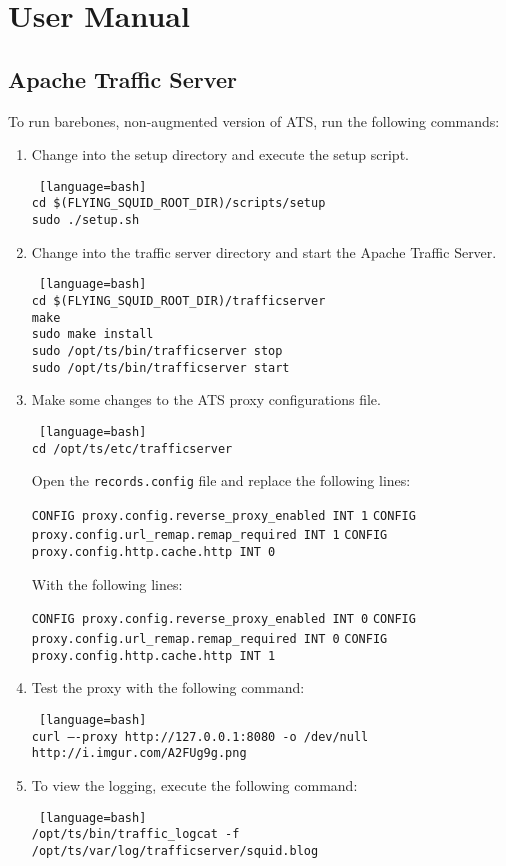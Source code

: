 \section{User Manual}

\subsection{Apache Traffic Server}

To run barebones, non-augmented version of ATS, run the following commands:

\begin{enumerate}

\item Change into the setup directory and execute the setup script.

\begin{lstlisting} [language=bash] 
cd $(FLYING_SQUID_ROOT_DIR)/scripts/setup
sudo ./setup.sh
\end{lstlisting}

\item 

Change into the traffic server directory and start the Apache Traffic Server.

\begin{lstlisting} [language=bash] 
cd $(FLYING_SQUID_ROOT_DIR)/trafficserver
make
sudo make install
sudo /opt/ts/bin/trafficserver stop
sudo /opt/ts/bin/trafficserver start
\end{lstlisting}

\item Make some changes to the ATS proxy configurations file.

\begin{lstlisting} [language=bash] 
cd /opt/ts/etc/trafficserver
\end{lstlisting}

Open the \verb|records.config| file and replace the following lines:

\verb|CONFIG proxy.config.reverse_proxy_enabled INT 1|
\verb|CONFIG proxy.config.url_remap.remap_required INT 1|
\verb|CONFIG proxy.config.http.cache.http INT 0|

With the following lines:

\verb|CONFIG proxy.config.reverse_proxy_enabled INT 0|
\verb|CONFIG proxy.config.url_remap.remap_required INT 0|
\verb|CONFIG proxy.config.http.cache.http INT 1|

\item Test the proxy with the following command:

\begin{lstlisting} [language=bash] 
curl —-proxy http://127.0.0.1:8080 -o /dev/null http://i.imgur.com/A2FUg9g.png
\end{lstlisting}

\item To view the logging, execute the following command:

\begin{lstlisting} [language=bash] 
/opt/ts/bin/traffic_logcat -f /opt/ts/var/log/trafficserver/squid.blog
\end{lstlisting}

\end{enumerate}

